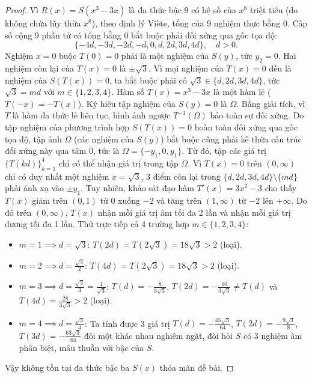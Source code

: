 \documentclass{article}
\begin{document}
\begin{proof}
Vì $R(x) = S(x^3 - 3x)$ là đa thức bậc 9 có hệ số của $x^8$ triệt tiêu (do không chứa lũy thừa $x^8$), theo định lý Viète, tổng của 9 nghiệm thực bằng $0$.
Cấp số cộng 9 phần tử có tổng bằng $0$ bắt buộc phải đối xứng qua gốc tọa độ:
\begin{equation}
    \{-4d, -3d, -2d, -d, 0, d, 2d, 3d, 4d\}, \quad d > 0.
\end{equation}
Nghiệm $x = 0$ buộc $T(0) = 0$ phải là một nghiệm của $S(y)$, tức $y_2 = 0$.
Hai nghiệm còn lại của $T(x) = 0$ là $\pm\sqrt{3}$. Vì mọi nghiệm của $T(x) = 0$ đều là nghiệm của $S(T(x)) = 0$, ta bắt buộc phải có $\sqrt{3} \in \{d, 2d, 3d, 4d\}$, tức $\sqrt{3} = md$ với $m \in \{1, 2, 3, 4\}$.
Hàm số $T(x) = x^3 - 3x$ là một hàm lẻ ($T(-x) = -T(x)$). Ký hiệu tập nghiệm của $S(y)=0$ là $\Omega$. Bằng giải tích, vì $T$ là hàm đa thức lẻ liên tục, hình ảnh ngược $T^{-1}(\Omega)$ bảo toàn sự đối xứng. Do tập nghiệm của phương trình hợp $S(T(x)) = 0$ hoàn toàn đối xứng qua gốc tọa độ, tập ảnh $\Omega$ (các nghiệm của $S(y)$) bắt buộc cũng phải kế thừa cấu trúc đối xứng này qua tâm $0$, tức là $\Omega = \{ -y_1, 0, y_1 \}$. Từ đó, tập các giá trị $\{T(kd)\}_{k=1}^4$ chỉ có thể nhận giá trị trong tập $\Omega$.
Vì $T(x) = 0$ trên $(0, \infty)$ chỉ có duy nhất một nghiệm $x = \sqrt{3}$, 3 điểm còn lại trong $\{d, 2d, 3d, 4d\} \setminus \{md\}$ phải ánh xạ vào $\pm y_1$.
Tuy nhiên, khảo sát đạo hàm $T'(x) = 3x^2 - 3$ cho thấy $T(x)$ giảm trên $(0, 1)$ từ $0$ xuống $-2$ và tăng trên $(1, \infty)$ từ $-2$ lên $+\infty$. Do đó trên $(0, \infty)$, $T(x)$ nhận mỗi giá trị âm tối đa 2 lần và nhận mỗi giá trị dương tối đa 1 lần.
Thử trực tiếp cả 4 trường hợp $m \in \{1, 2, 3, 4\}$:
\begin{itemize}
    \item $m = 1 \implies d = \sqrt{3}$: $T(2d) = T(2\sqrt{3}) = 18\sqrt{3} > 2$ (loại).
    \item $m = 2 \implies d = \frac{\sqrt{3}}{2}$: $T(4d) = T(2\sqrt{3}) = 18\sqrt{3} > 2$ (loại).
    \item $m = 3 \implies d = \frac{\sqrt{3}}{3} = \frac{1}{\sqrt{3}}$: $T(d) = -\frac{8}{3\sqrt{3}}$, $T(2d) = -\frac{10}{3\sqrt{3}} \ne T(d)$ và $T(4d) = \frac{28}{3\sqrt{3}} > 2$ (loại).
    \item $m = 4 \implies d = \frac{\sqrt{3}}{4}$: Ta tính được 3 giá trị $T(d) = -\frac{45\sqrt{3}}{64}$, $T(2d) = -\frac{9\sqrt{3}}{8}$, $T(3d) = -\frac{63\sqrt{3}}{64}$ đôi một khác nhau nghiêm ngặt, đòi hỏi $S$ có 3 nghiệm âm phân biệt, mâu thuẫn với bậc của $S$.
\end{itemize}
Vậy không tồn tại đa thức bậc ba $S(x)$ thỏa mãn đề bài.
\end{proof}
\end{document}
